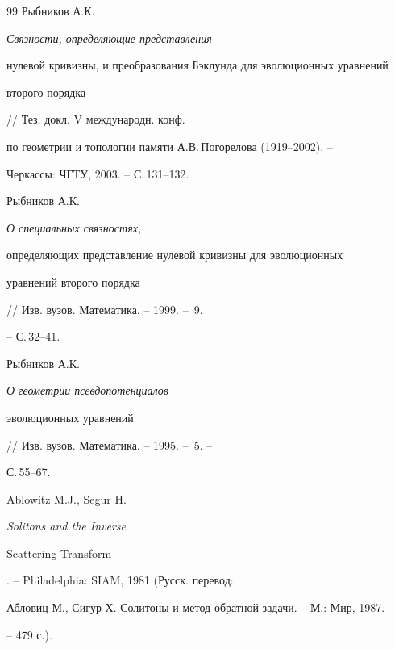 \begin{thebibliography}{99}
 Рыбников А.К. {\it Связности, определяющие представления 


нулевой кривизны, и преобразования Бэклунда для эволюционных уравнений 


второго порядка} // Тез. докл. V международн. конф. 


по геометрии и топологии памяти А.В.\,Погорелова (1919--2002). -- 


Черкассы: ЧГТУ, 2003. -- С.\,131--132.


 Рыбников А.К. {\it О специальных связностях, 


определяющих представление нулевой кривизны для эволюционных 


уравнений второго порядка} // Изв. вузов. Математика. -- 1999. -- \No\,9. 


-- С.\,32--41.


 Рыбников А.К. {\it О геометрии псевдопотенциалов 


эволюционных уравнений} // Изв. вузов. Математика. -- 1995. -- \No\,5. -- 


С.\,55--67.


 Ablowitz M.J., Segur H. {\it Solitons and the Inverse 


Scattering Transform}. -- Philadelphia: SIAM, 1981 (Русск. перевод:


Абловиц М., Сигур Х. Солитоны и метод обратной задачи. -- М.: Мир, 1987.


-- 479 с.).





\end{thebibliography}





\vskip 2cm












\label{end}





